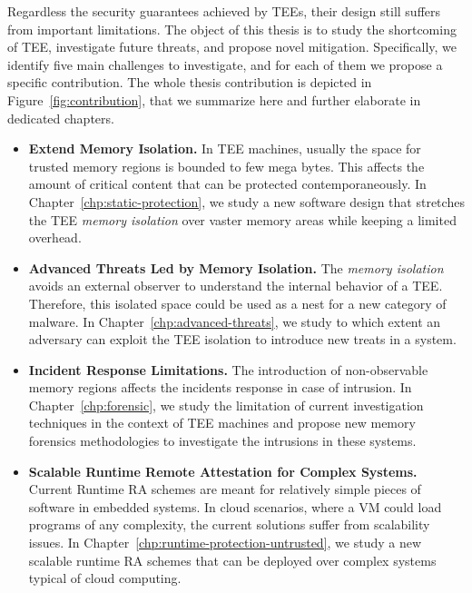 Regardless the security guarantees achieved by TEEs, their design still 
suffers from important limitations.
The object of this thesis is to study the shortcoming of TEE, 
investigate future threats, and propose novel mitigation.
Specifically, we identify five main challenges to investigate, and for each of 
them we propose a specific contribution.
The whole thesis contribution is depicted in 
Figure~\ref{fig:contribution}, that we summarize here and further elaborate in 
dedicated chapters.

\begin{itemize}
	\item[\circledrA{1}] \textbf{Extend Memory Isolation.}
	In TEE machines, usually the space for trusted memory regions is bounded 
	to few mega bytes. 
	This affects the amount of critical content that can be protected 	
	contemporaneously.
	In Chapter~\ref{chp:static-protection}, we study a new software design that 
	stretches the TEE \emph{memory isolation} over vaster memory areas while 
	keeping a limited overhead.
	
	\item[\circledrA{2}] \textbf{Advanced Threats Led by Memory Isolation.} The 
	\emph{memory isolation} avoids an external observer to understand the 
	internal behavior of a TEE. Therefore, this isolated space could 
	be used as a nest for a new category of malware.
	In Chapter~\ref{chp:advanced-threats}, we study to which extent an 
	adversary can exploit the TEE isolation to introduce new treats in a system.

	\item[\circledrA{3}]
	\textbf{Incident Response Limitations.} The introduction of 
	non-observable memory regions affects the incidents response in 
	case of intrusion.
	In Chapter~\ref{chp:forensic}, we study the limitation of current 
	investigation techniques in the context of TEE machines and propose new 
	memory forensics methodologies to investigate the intrusions in these 
	systems.
	
	\item[\circledrA{4}]
	\textbf{Scalable Runtime Remote Attestation for Complex Systems.}
	Current Runtime RA schemes are meant for relatively simple pieces of 
	software in embedded systems.
	In cloud scenarios, where a VM could load programs of any complexity, the 
	current solutions suffer from scalability issues.
	In Chapter~\ref{chp:runtime-protection-untrusted}, we study a new scalable 
	runtime RA schemes that can be deployed over 
	complex systems typical of cloud computing.
	

\end{itemize}
